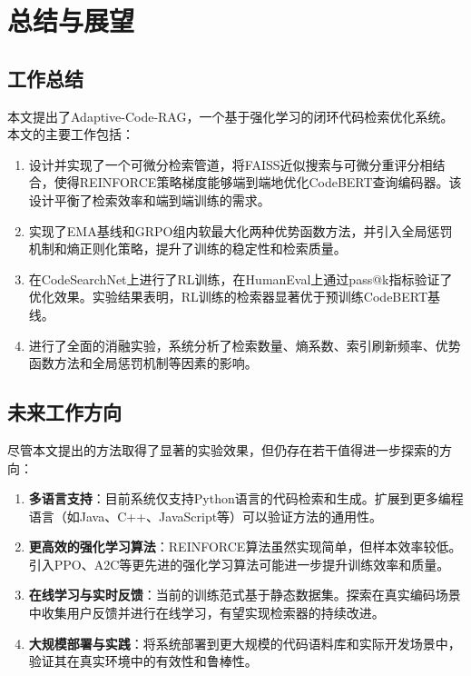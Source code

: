 \documentclass[
    fontset = win, %
  ]{njuthesis}
\begin{document}
\chapter{总结与展望}

\section{工作总结}

本文提出了Adaptive-Code-RAG，一个基于强化学习的闭环代码检索优化系统。本文的主要工作包括：

\begin{enumerate}
    \item 设计并实现了一个可微分检索管道，将FAISS\cite{faiss2019}近似搜索与可微分重评分相结合，使得REINFORCE策略梯度能够端到端地优化CodeBERT查询编码器。该设计平衡了检索效率和端到端训练的需求。
    \item 实现了EMA基线和GRPO组内软最大化两种优势函数方法，并引入全局惩罚机制和熵正则化策略，提升了训练的稳定性和检索质量。
    \item 在CodeSearchNet上进行了RL训练，在HumanEval上通过pass@k指标验证了优化效果。实验结果表明，RL训练的检索器显著优于预训练CodeBERT基线。
    \item 进行了全面的消融实验，系统分析了检索数量、熵系数、索引刷新频率、优势函数方法和全局惩罚机制等因素的影响。
\end{enumerate}

\section{未来工作方向}

尽管本文提出的方法取得了显著的实验效果，但仍存在若干值得进一步探索的方向：

\begin{enumerate}
    \item \textbf{多语言支持}：目前系统仅支持Python语言的代码检索和生成。扩展到更多编程语言（如Java、C++、JavaScript等）可以验证方法的通用性。
    \item \textbf{更高效的强化学习算法}：REINFORCE算法虽然实现简单，但样本效率较低。引入PPO\cite{ppo2017}、A2C等更先进的强化学习算法可能进一步提升训练效率和质量。
    \item \textbf{在线学习与实时反馈}：当前的训练范式基于静态数据集。探索在真实编码场景中收集用户反馈并进行在线学习，有望实现检索器的持续改进。
    \item \textbf{大规模部署与实践}：将系统部署到更大规模的代码语料库和实际开发场景中，验证其在真实环境中的有效性和鲁棒性。
\end{enumerate}
\end{document}
